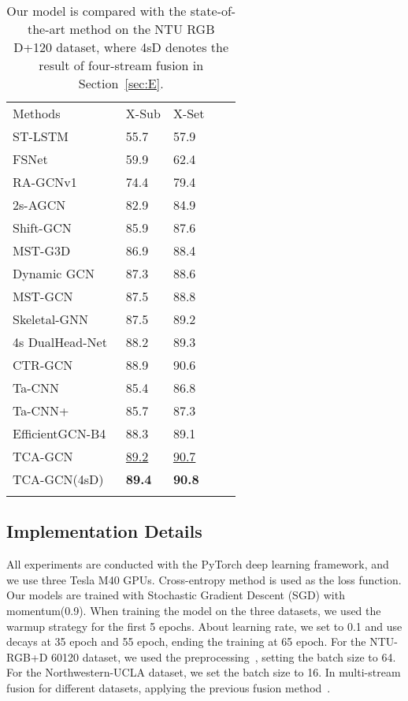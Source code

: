 \documentclass[letterpaper]{article} \usepackage[submission]{aaai23}  \usepackage{times}  \usepackage{helvet}  \usepackage{courier}  \usepackage[hyphens]{url}  \usepackage{graphicx} \urlstyle{rm} \def\UrlFont{\rm}  \usepackage{natbib}  \usepackage{caption} \frenchspacing  \setlength{\pdfpagewidth}{8.5in} \setlength{\pdfpageheight}{11in} \usepackage{algorithm}
\begin{document}
\begin{table}[ht]
 \centering
\begin{tabular}{lllll}
\hline\noalign{\smallskip}
Methods &X-Sub&X-Set\\
\noalign{\smallskip}\hline\noalign{\smallskip}
ST-LSTM~\citeyearpar{2016Spatio}&55.7&57.9\\
FSNet~\citeyearpar{2019Skeleton12}&59.9&62.4\\
RA-GCNv1~\citeyearpar{2019Richly}&74.4&79.4\\
2s-AGCN~\citeyearpar{2018Two}&82.9&84.9\\
Shift-GCN~\citeyearpar{2020Skeletonshift}&85.9&87.6\\
MST-G3D\citeyearpar{2020Disentangling} &86.9&88.4 \\
Dynamic GCN~\citeyearpar{2020Dynamic}&87.3&88.6\\
MST-GCN~\citeyearpar{2021Multi} &87.5&88.8 \\
Skeletal-GNN~\citeyearpar{2021Learning}&87.5&89.2\\
4s DualHead-Net~\citeyearpar{2021Learning1}&88.2&89.3\\
CTR-GCN~\citeyearpar{2021Channel}&88.9&90.6\\
Ta-CNN~\citeyearpar{xu2022topology}&85.4&86.8\\
Ta-CNN+~\citeyearpar{xu2022topology}&85.7&87.3\\
EfficientGCN-B4~\citeyearpar{2021Constructing}&88.3&89.1\\
\noalign{\smallskip}\hline
TCA-GCN&\underline{89.2}& \underline{90.7}\\
TCA-GCN(4sD)&{\bf 89.4}&{\bf 90.8}\\
\noalign{\smallskip}\hline
\end{tabular}\caption{Our model is compared with the state-of-the-art method on the NTU RGB D+120 dataset, where 4sD denotes the result of four-stream fusion in Section~\ref{sec:E}.}
\label{tab:33}
\end{table}

\subsection{Implementation Details}
\label{sec:AB}
All experiments are conducted  with the PyTorch deep learning framework, and we use three Tesla M40 GPUs. Cross-entropy method is used as the loss function. Our models are trained with Stochastic Gradient Descent (SGD) with momentum(0.9).  When training the model on the three datasets, we used the warmup strategy for the first 5 epochs. About learning rate, we set to 0.1 and use decays at 35 epoch and 55 epoch, ending the training at 65 epoch. For the NTU-RGB+D 60120 dataset, we used the preprocessing~\cite{2020Semantics}, setting the batch size to 64. For the Northwestern-UCLA dataset, we set the batch size to 16. In multi-stream fusion for different datasets, applying the previous fusion method~\cite{2021Channel, 2020Skeletonshift, 2020Dynamic}.
\end{document}
